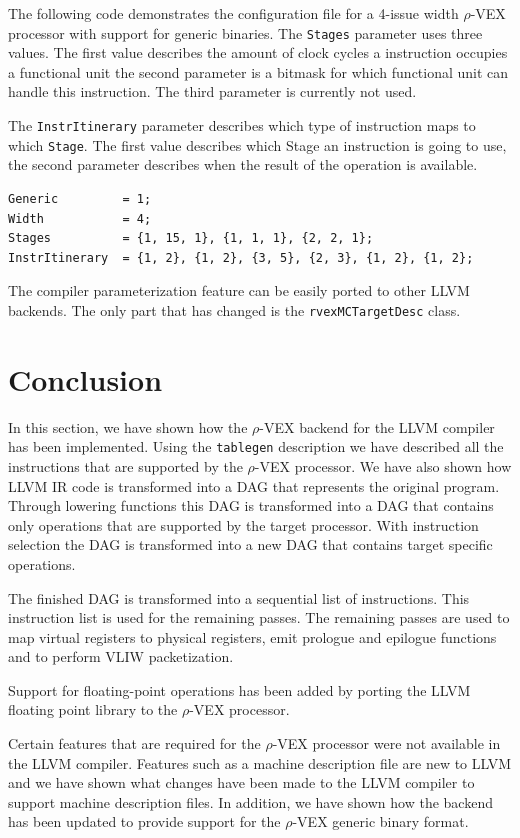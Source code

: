 The following code demonstrates the configuration file for a 4-issue width  $\rho$-VEX processor with support for generic binaries. The \texttt{Stages} parameter uses three values. The first value describes the amount of clock cycles a instruction occupies a functional unit the second parameter is a bitmask for which functional unit can handle this instruction. The third parameter is currently not used.

The \texttt{InstrItinerary} parameter describes which type of instruction maps to which \texttt{Stage}. The first value describes which Stage an instruction is going to use, the second parameter describes when the result of the operation is available.

\begin{lstlisting}[language=config]
Generic         = 1;
Width           = 4; 
Stages          = {1, 15, 1}, {1, 1, 1}, {2, 2, 1};
InstrItinerary  = {1, 2}, {1, 2}, {3, 5}, {2, 3}, {1, 2}, {1, 2};
\end{lstlisting}

The compiler parameterization feature can be easily ported to other LLVM backends. The only part that has changed is the \texttt{rvexMCTargetDesc} class. 

\section{Conclusion}
In this section, we have shown how the $\rho$-VEX backend for the LLVM compiler has been implemented. Using the \texttt{tablegen} description we have described all the instructions that are supported by the $\rho$-VEX processor. We have also shown how LLVM IR code is transformed into a DAG that represents the original program. Through lowering functions this DAG is transformed into a DAG that contains only operations that are supported by the target processor. With instruction selection the DAG is transformed into a new DAG that contains target specific operations.

The finished DAG is transformed into a sequential list of instructions. This instruction list is used for the remaining passes. The remaining passes are used to map virtual registers to physical registers, emit prologue and epilogue functions and to perform VLIW packetization.

Support for floating-point operations has been added by porting the LLVM floating point library to the $\rho$-VEX processor.

Certain features that are required for the $\rho$-VEX processor were not available in the LLVM compiler. Features such as a machine description file are new to LLVM and we have shown what changes have been made to the LLVM compiler to support machine description files. In addition, we have shown how the backend has been updated to provide support for the $\rho$-VEX generic binary format.


\acresetall

